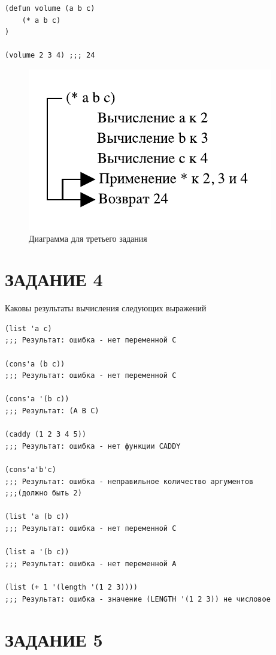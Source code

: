 \begin{lstlisting}
(defun volume (a b c)
    (* a b c)
)

(volume 2 3 4) ;;; 24
\end{lstlisting}

\begin{figure}[H]
    \centering
    \includegraphics{img/03.pdf}
    \caption{Диаграмма для третьего задания}
\end{figure}

\section{ЗАДАНИЕ 4}

Каковы результаты вычисления следующих выражений

\begin{lstlisting}
(list 'a c)
;;; Результат: ошибка - нет переменной C

(cons'a (b c))
;;; Результат: ошибка - нет переменной C

(cons'a '(b c))
;;; Результат: (A B C)

(caddy (1 2 3 4 5))
;;; Результат: ошибка - нет функции CADDY

(cons'a'b'c)
;;; Результат: ошибка - неправильное количество аргументов
;;;(должно быть 2)

(list 'a (b c))
;;; Результат: ошибка - нет переменной C

(list a '(b c))
;;; Результат: ошибка - нет переменной A

(list (+ 1 '(length '(1 2 3))))
;;; Результат: ошибка - значение (LENGTH '(1 2 3)) не числовое
\end{lstlisting}

\section{ЗАДАНИЕ 5}


